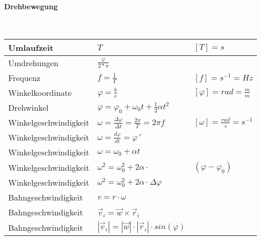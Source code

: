 \paragraph{Drehbewegung}\mbox{}\\
\noindent
\begin{tabularx}{\columnwidth}{@{}XXX@{}}
	Umlaufzeit                       & $T$                                                                  & $[T] = s$                              \\ \hline
	Umdrehungen						 & $\frac{\varphi}{2*\pi}$ \\ \hline
	Frequenz                         & $f=\frac{1}{T}$                                                      & $[f] = s^{-1} = Hz$                    \\ \hline
	Winkelkoordinate                 & $\varphi = \frac{b}{r}$                                              & $[\varphi] = rad = \frac{m}{m}$        \\ \hline
	Drehwinkel                       & $\varphi = \varphi_0 + \omega_0 t + \frac{1}{2}\alpha t^2$                                                    \\ \hline
	Winkelgeschwindigkeit            & $\omega = \frac{\Delta \varphi}{\Delta t} = \frac{2\pi}{T} = 2\pi f$ & $[\omega] = \frac{rad}{s} = s^{-1}$    \\ \hline
	Winkelgeschwindigkeit            & $\omega = \frac{d\varphi}{dt} = \varphi\,'$                                                                   \\ \hline
	Winkelgeschwindigkeit            & $\omega = \omega_0 + \alpha t$                                                                                \\ \hline
	Winkelgeschwindigkeit            & $\omega^2 = \omega_0^2 + 2\alpha\cdot $                              & $\left(\varphi-\varphi_{0}\right)$     \\ \hline
	Winkelgeschwindigkeit            & $\omega^2 = \omega_0^2 + 2\alpha\cdot\Delta \varphi$                                                          \\ \hline
	Bahngeschwindigkeit              & $v = r\cdot \omega$                                                                                           \\ \hline
	Bahngeschwindigkeit              & $\vec{v}_i = \vec{w} \times \vec{r}_i$                                                                        \\ \hline
	Bahngeschwindigkeit              & $|\vec{v}_i| = |\vec{w}| \cdot |\vec{r}_i| \cdot sin(\varphi)$                                                \\ \hline

\end{tabularx}
